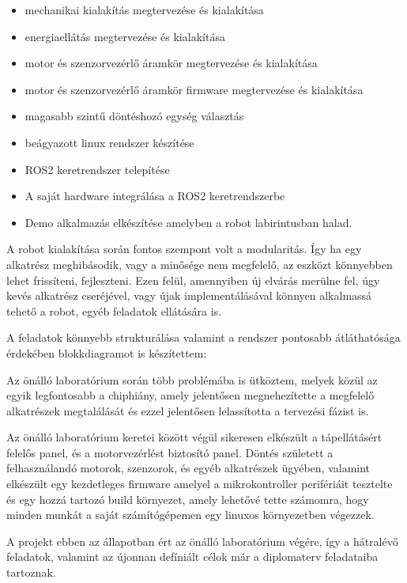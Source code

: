 \begin{itemize}
\item mechanikai kialakítás megtervezése és kialakítása
\item energiaellátás megtervezése és kialakítása
\item motor és szenzorvezérlő áramkör megtervezése és kialakítása
\item motor és szenzorvezérlő áramkör firmware megtervezése és kialakítása
\item magasabb szintű döntéshozó egység választás
\item beágyazott linux rendszer készítése
\item ROS2 keretrendszer telepítése
\item A saját hardware integrálása a ROS2 keretrendszerbe
\item Demo alkalmazás elkészítése amelyben a robot labirintusban halad.
\end{itemize}

A robot kialakítása során fontos szempont volt a modularitás. Így ha egy
alkatrész meghibásodik, vagy a minősége nem megfelelő, az eszközt könnyebben
lehet frissíteni, fejleszteni. Ezen felül, amennyiben új elvárás merülne fel,
úgy kevés alkatrész cseréjével, vagy újak implementálásával könnyen alkalmassá
tehető a robot, egyéb feladatok ellátására is.

A feladatok könnyebb strukturálása valamint a rendszer pontosabb átláthatósága
érdekében blokkdiagramot is készítettem:


Az önálló laboratórium során több problémába is ütköztem, melyek közül az egyik
legfontosabb a chiphiány, amely jelentősen megnehezítette a  megfelelő
alkatrészek megtalálását és ezzel jelentősen lelassította a tervezési fázist is.

Az önálló laboratórium keretei között végül sikeresen elkészült a tápellátásért
felelős panel, és a motorvezérlést biztosító panel. Döntés született a
felhasználandó motorok, szenzorok, és egyéb alkatrészek ügyében, valamint
elkészült egy kezdetleges firmware amelyel a mikrokontroller perifériáit
tesztelte és egy hozzá tartozó build környezet, amely lehetővé tette számomra,
hogy minden munkát a saját számítógépemen egy linuxos környezetben végezzek.

A projekt ebben az állapotban ért az önálló laboratórium végére, így a hátralévő
feladatok, valamint az újonnan defíniált célok már a diplomaterv feladataiba
tartoznak.


